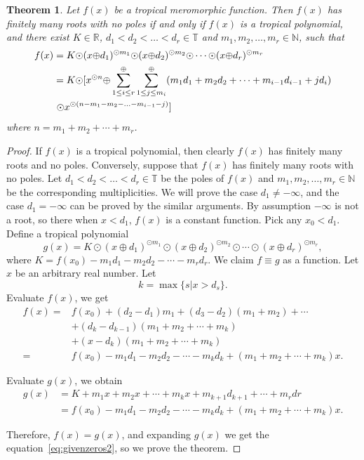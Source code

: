 \documentclass{amsart}
\newtheorem{thm}{Theorem}[section]
\theoremstyle{definition}
\theoremstyle{remark}
\begin{document}
\begin{thm}\label{thm:givenzeros}
Let $f(x)$ be a tropical meromorphic function. Then $f(x)$ has finitely many roots with no poles if and only if $f(x)$ is a tropical polynomial, and there exist $K \in {\mathbb{R}}$, $d_1 < d_2 < \ldots < d_r \in {\mathbb{T}}$ and $m_1, m_2, \ldots, m_r \in {\mathbb{N}}$, such that
\begin{align}
f(x) 	&= K {\odot} (x {\oplus} d_1)^{{\odot} m_1} {\odot} (x {\oplus} d_2)^{{\odot} m_2} {\odot} \cdots {\odot} (x {\oplus} d_r)^{{\odot} m_r} \label{eq:givenroots1}\\
	&= K {\odot} [x^{{\odot} n} {\oplus} \sum^{\oplus}_{1 \leq i \leq r}\sum^{\oplus}_{1 \leq j \leq m_i} (m_1 d_1 + m_2 d_2 + \cdots + m_{i-1} d_{i-1} + j d_i) \\
	&\  {\odot} x^{{\odot} (n - m_1 - m_2 - \ldots - m_{i-1} - j)}] \label{eq:givenzeros2} \notag
\end{align}
where $n = m_1 + m_2 + \cdots + m_r$.
\end{thm}
\begin{proof}
If $f(x)$ is a tropical polynomial, then clearly $f(x)$ has finitely many roots and no poles. Conversely, suppose that $f(x)$ has finitely many roots with no poles. Let $d_1 < d_2 < \ldots < d_r \in {\mathbb{T}}$ be the poles of $f(x) $ and  $m_1, m_2, \ldots, m_r \in {\mathbb{N}}$ be the corresponding multiplicities. We will prove the case $d_1 \neq -\infty$, and the case $d_1 = - \infty$ can be proved by the similar arguments. By assumption $-\infty$ is not a root, so there when $x < d_1$, $f(x)$ is a constant function. Pick any $x_0 < d_1$. Define a tropical polynomial
\[
g(x) = K {\odot} (x {\oplus} d_1)^{{\odot} m_1} {\odot} (x {\oplus} d_2)^{{\odot} m_2} {\odot} \cdots {\odot} (x {\oplus} d_r)^{{\odot} m_r},
\]
where $K = f(x_0) - m_1 d_1 - m_2 d_2 - \cdots - m_r d_r$. We claim $f \equiv g$ as a function. Let $x$ be an arbitrary real number. Let
\[
k = \max \{s | x > d_s \}.
\]
Evaluate $f(x)$, we get
\begin{equation}\label{eq:evfx}
\begin{split}
f(x) 	= &f(x_0) + (d_2 - d_1) m_1 + (d_3 - d_2) (m_1 + m_2) + \cdots \\
	    &+ (d_k - d_{k-1}) (m_1 + m_2 + \cdots + m_k) \\
	    & + (x-d_k) (m_1 + m_2 + \cdots + m_k)\\
	= &f(x_0) - m_1 d_1 - m_2 d_2 - \cdots - m_{k} d_k + (m_1 + m_2 + \cdots + m_k) x.
\end{split}
\end{equation}

Evaluate $g(x)$, we obtain
\begin{align*}
g(x) 	&= K + m_1 x + m_2 x + \cdots + m_k x + m _{k+1} d_{k+1} + \cdots + m_r dr \\
	&= f(x_0) - m_1 d_1 - m_2 d_2 - \cdots - m_k d_k + (m_1 + m_2 + \cdots + m_k) x.
\end{align*}

Therefore, $f(x) = g(x)$, and expanding $g(x)$ we get the equation~\ref{eq:givenzeros2}, so we prove the theorem. 
\end{proof}
\end{document}
